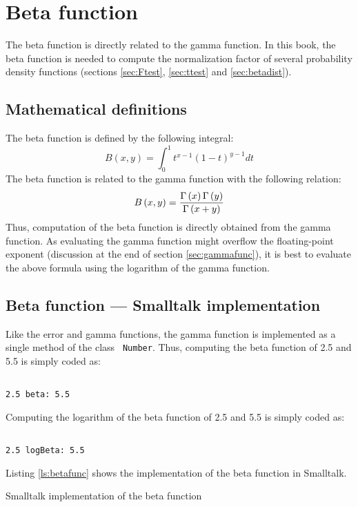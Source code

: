 \documentclass[twoside]{book}
\begin{document}
\section{Beta function}
\label{sec:betafunc} The beta function is directly related to the
gamma function. In this book, the beta function is needed to
compute the normalization factor of several probability density
functions (\cf sections \ref{sec:Ftest}, \ref{sec:ttest} and
\ref{sec:betadist}).
\subsection{Mathematical definitions}
The beta function is defined by the following integral:
\begin{equation}
\label{eq:betaint} B\left(x,y\right)=\int_0^1
t^{x-1}\left(1-t\right)^{y-1}dt
\end{equation}
The beta function is related to the gamma function with the
following relation:
\begin{equation}
B\left(x,y\right)={\Gamma\left(x\right)\Gamma\left(y\right)\over\Gamma\left(x+y\right)}
\end{equation}
Thus, computation of the beta function is directly obtained from
the gamma function. As evaluating the gamma function might
overflow the floating-point exponent (\cf discussion at the end of
section \ref{sec:gammafunc}), it is best to evaluate the above
formula using the logarithm of the gamma function.

\subsection{Beta function --- Smalltalk implementation}
 Like the error and gamma functions, the
gamma function is implemented as a single method of the class {\tt
Number}. Thus, computing the beta function of 2.5 and 5.5 is
simply coded as:
\begin{codeExample}
\begin{verbatim}

2.5 beta: 5.5
\end{verbatim}
\end{codeExample} Computing the logarithm of the beta function of
2.5 and 5.5 is simply coded as:
\begin{codeExample}
\begin{verbatim}

2.5 logBeta: 5.5
\end{verbatim}
\end{codeExample}
Listing \ref{ls:betafunc} shows the
implementation of the beta function in Smalltalk.

\begin{listing}
Smalltalk implementation of the beta function
\label{ls:betafunc}

\end{listing}




\ifx\wholebook\relax\else
\end{document}
